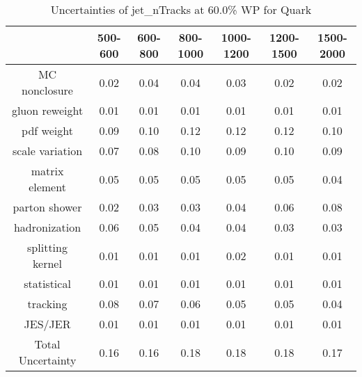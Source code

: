 \begin{table}
\centering
\caption{Uncertainties of jet_nTracks at 60.0\% WP for Quark}
\label{tab:syst_jet_nTracks_0.6_Quark}
\begin{tabular}{ccccccc}
\toprule
{} &  500-600 &  600-800 &  800-1000 &  1000-1200 &  1200-1500 &  1500-2000 \\
\midrule
MC nonclosure     &     0.02 &     0.04 &      0.04 &       0.03 &       0.02 &       0.02 \\
gluon reweight    &     0.01 &     0.01 &      0.01 &       0.01 &       0.01 &       0.01 \\
pdf weight        &     0.09 &     0.10 &      0.12 &       0.12 &       0.12 &       0.10 \\
scale variation   &     0.07 &     0.08 &      0.10 &       0.09 &       0.10 &       0.09 \\
matrix element    &     0.05 &     0.05 &      0.05 &       0.05 &       0.05 &       0.04 \\
parton shower     &     0.02 &     0.03 &      0.03 &       0.04 &       0.06 &       0.08 \\
hadronization     &     0.06 &     0.05 &      0.04 &       0.04 &       0.03 &       0.03 \\
splitting kernel  &     0.01 &     0.01 &      0.01 &       0.02 &       0.01 &       0.01 \\
statistical       &     0.01 &     0.01 &      0.01 &       0.01 &       0.01 &       0.01 \\
tracking          &     0.08 &     0.07 &      0.06 &       0.05 &       0.05 &       0.04 \\
JES/JER           &     0.01 &     0.01 &      0.01 &       0.01 &       0.01 &       0.01 \\
Total Uncertainty &     0.16 &     0.16 &      0.18 &       0.18 &       0.18 &       0.17 \\
\bottomrule
\end{tabular}
\end{table}
